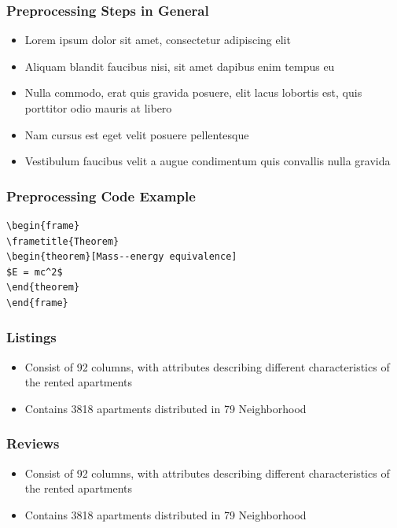 \documentclass{beamer}
\begin{document}
\begin{frame}
\frametitle{Preprocessing Steps in General}
\begin{itemize}
\item Lorem ipsum dolor sit amet, consectetur adipiscing elit
\item Aliquam blandit faucibus nisi, sit amet dapibus enim tempus eu
\item Nulla commodo, erat quis gravida posuere, elit lacus lobortis est, quis porttitor odio mauris at libero
\item Nam cursus est eget velit posuere pellentesque
\item Vestibulum faucibus velit a augue condimentum quis convallis nulla gravida
\end{itemize}
\end{frame}

\begin{frame}[fragile] %
\frametitle{Preprocessing Code Example}
\begin{example}
\begin{verbatim}
\begin{frame}
\frametitle{Theorem}
\begin{theorem}[Mass--energy equivalence]
$E = mc^2$
\end{theorem}
\end{frame}\end{verbatim}
\end{example}
\end{frame}


\begin{frame}
\frametitle{Listings}
\begin{itemize}
\item Consist of 92 columns, with attributes describing different characteristics of the rented apartments
\item Contains 3818 apartments distributed in 79 Neighborhood
\end{itemize}
\end{frame}


\begin{frame}
\frametitle{Reviews}
\begin{itemize}
\item Consist of 92 columns, with attributes describing different characteristics of the rented apartments
\item Contains 3818 apartments distributed in 79 Neighborhood
\end{itemize}
\end{frame}
\end{document}
